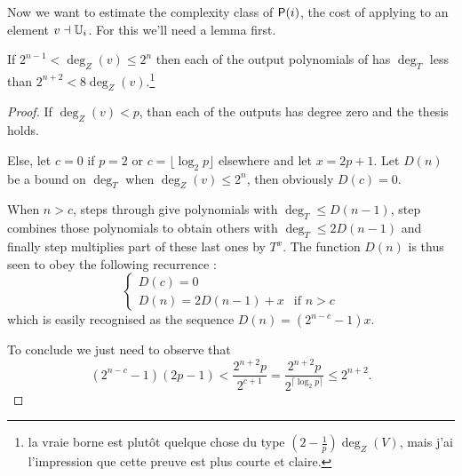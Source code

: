 Now we want to estimate the complexity class of $\mathrm{\sf P}(i)$, the cost
of applying  to an element $v\dashv\mathbb{U}_i$. For this we'll
need a lemma first.

\begin{lemma}
  \label{th:push-down-degree}
  If $2^{n-1} < \deg_Z(v) \le 2^n$ then each of the output polynomials
  of  has $\deg_T$ less than $2^{n+2} <
  8\deg_Z(v)$.\footnote{la vraie borne est plutôt quelque chose du
    type $(2-\frac{1}{p})\deg_Z(V)$, mais j'ai l'impression que cette
    preuve est plus courte et claire.}
\end{lemma}
\begin{proof}
  If $\deg_Z(v) < p$, than each of the outputs has degree zero and the
  thesis holds.

  Else, let $c=0$ if $p=2$ or $c = \lfloor\log_2p\rfloor$ elsewhere
  and let $x=2p+1$. Let $D(n)$ be a bound on $\deg_T$ when $\deg_Z(v)
  \le 2^n$, then obviously $D(c) = 0$.

  When $n > c$, steps  through
   give polynomials with $\deg_T \le D(n-1)$,
  step  combines those polynomials to obtain
  others with $\deg_T \le 2D(n-1)$ and finally step
   multiplies part of these last ones by
  $T^x$. The function $D(n)$ is thus seen to obey the following
  recurrence :
  \begin{equation*}
    \begin{cases}
      D(c) = 0\\
      D(n) = 2D(n-1) + x &\text{if $n>c$}
    \end{cases}
  \end{equation*}
  which is easily recognised as the sequence $D(n) = (2^{n-c}-1)x$.

  To conclude we just need to observe that
  \begin{equation*}
    (2^{n-c}-1)(2p-1) < \frac{2^{n+2}p}{2^{c+1}} =
    \frac{2^{n+2}p}{2^{\lceil\log_2p\rceil}} \le 2^{n+2}\text{.}
  \end{equation*}
\end{proof}

